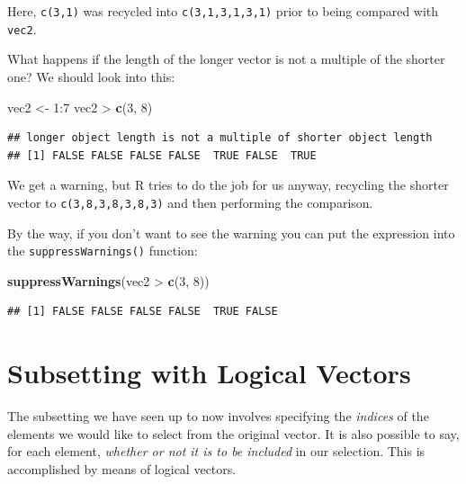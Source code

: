\documentclass[]{book}
\makeatletter
\newenvironment{Shaded}{\begin{snugshade}}{\end{snugshade}}
\newcommand{\KeywordTok}[1]{\textcolor[rgb]{0.13,0.29,0.53}{\textbf{{#1}}}}
\newcommand{\DecValTok}[1]{\textcolor[rgb]{0.00,0.00,0.81}{{#1}}}
\newcommand{\StringTok}[1]{\textcolor[rgb]{0.31,0.60,0.02}{{#1}}}
\newcommand{\NormalTok}[1]{{#1}}
\newenvironment{kframe}{%
\medskip{}
\setlength{\fboxsep}{.8em}
 \def\at@end@of@kframe{}%
 \ifinner\ifhmode%
  \def\at@end@of@kframe{\end{minipage}}%
  \begin{minipage}{\columnwidth}%
 \fi\fi%
 \def\FrameCommand##1{\hskip\@totalleftmargin \hskip-\fboxsep
 \colorbox{shadecolor}{##1}\hskip-\fboxsep
     \hskip-\linewidth \hskip-\@totalleftmargin \hskip\columnwidth}%
 \MakeFramed {\advance\hsize-\width
   \@totalleftmargin\z@ \linewidth\hsize
   \@setminipage}}%
 {\par\unskip\endMakeFramed%
 \at@end@of@kframe}
\renewenvironment{Shaded}{\begin{kframe}}{\end{kframe}}
\theoremstyle{definition}
\theoremstyle{definition}
\theoremstyle{remark}
\makeatother
\begin{document}
Here, \texttt{c(3,1)} was recycled into \texttt{c(3,1,3,1,3,1)} prior to
being compared with \texttt{vec2}.

What happens if the length of the longer vector is not a multiple of the
shorter one? We should look into this:

\begin{Shaded}
\begin{Highlighting}[]
\NormalTok{vec2 <-}\StringTok{ }\DecValTok{1}\NormalTok{:}\DecValTok{7}
\NormalTok{vec2 >}\StringTok{ }\KeywordTok{c}\NormalTok{(}\DecValTok{3}\NormalTok{, }\DecValTok{8}\NormalTok{)}
\end{Highlighting}
\end{Shaded}

\begin{verbatim}
## longer object length is not a multiple of shorter object length
## [1] FALSE FALSE FALSE FALSE  TRUE FALSE  TRUE
\end{verbatim}

We get a warning, but R tries to do the job for us anyway, recycling the
shorter vector to \texttt{c(3,8,3,8,3,8,3)} and then performing the
comparison.

By the way, if you don't want to see the warning you can put the
expression into the
\texttt{suppressWarnings()}
function:

\begin{Shaded}
\begin{Highlighting}[]
\KeywordTok{suppressWarnings}\NormalTok{(vec2 >}\StringTok{ }\KeywordTok{c}\NormalTok{(}\DecValTok{3}\NormalTok{, }\DecValTok{8}\NormalTok{))}
\end{Highlighting}
\end{Shaded}

\begin{verbatim}
## [1] FALSE FALSE FALSE FALSE  TRUE FALSE
\end{verbatim}

\section{Subsetting with Logical
Vectors}\label{subsetting-with-logical-vectors}

The subsetting we have seen up to now involves specifying the
\emph{indices} of the elements we would like to select from the original
vector. It is also possible to say, for each element, \emph{whether or
not it is to be included} in our selection. This is accomplished by
means of logical vectors.
\end{document}
